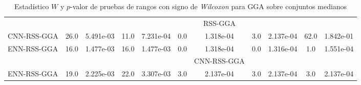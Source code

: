 \begin{table}[]
\begin{adjustbox}{max width =\textwidth}
\begin{tabular}{l c c c c c c c c c c}
\hline

 & & & & & & RSS-GGA & & & & \\
CNN-RSS-GGA & 26.0 & 5.491e-03 & 11.0 & 7.231e-04 & 0.0 & 1.318e-04 & 3.0 & 2.137e-04 & 62.0 & 1.842e-01 \\ 
ENN-RSS-GGA & 16.0 & 1.477e-03 & 16.0 & 1.477e-03 & 0.0 & 1.318e-04 & 0.0 & 1.316e-04 & 1.0 & 1.551e-04 \\ 

\hline

 & & & & & & CNN-RSS-GGA & & & & \\ 
ENN-RSS-GGA & 19.0 & 2.225e-03 & 22.0 & 3.307e-03 & 3.0 & 2.137e-04 & 3.0 & 2.137e-04 & 3.0 & 2.137e-04 \\ 

\hline

\end{tabular}
\end{adjustbox}
\caption[Pruebas de \emph{Wilcoxon} entre GGA y variaciones para conjuntos medianos]{Estadístico $W$ y $p$-valor de pruebas de rangos con signo de \emph{Wilcoxon} para GGA sobre conjuntos medianos}
\label{wilcox-gga-med}
\end{table}


